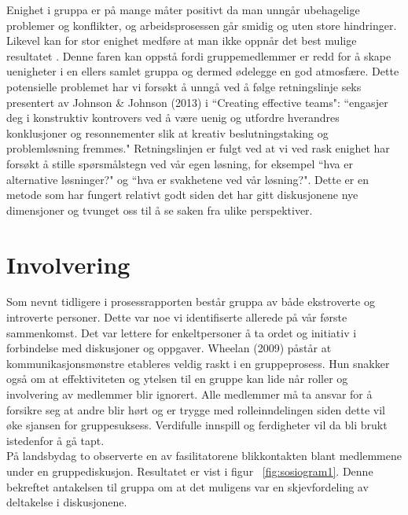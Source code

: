 Enighet i gruppa er på mange måter positivt da man unngår ubehagelige problemer og konflikter, og arbeidsprosessen går smidig og uten store hindringer. Likevel kan for stor enighet medføre at man ikke oppnår det best mulige resultatet \cite{effectiveTeams}. Denne faren kan oppstå fordi gruppemedlemmer er redd for å skape uenigheter i en ellers samlet gruppa og dermed ødelegge en god atmosfære. Dette potensielle problemet har vi forsøkt å unngå ved å følge retningslinje seks presentert av Johnson \& Johnson (2013)\cite{gruppeteori} i ``Creating effective teams": ``engasjer deg i konstruktiv kontrovers ved å være uenig og utfordre hverandres konklusjoner og resonnementer slik at kreativ beslutningstaking og problemløsning fremmes." Retningslinjen er fulgt ved at vi ved rask enighet har forsøkt å stille spørsmålstegn ved vår egen løsning, for eksempel ``hva er alternative løsninger?" og ``hva er svakhetene ved vår løsning?". Dette er en metode som har fungert relativt godt siden det har gitt diskusjonene nye dimensjoner og tvunget oss til å se saken fra ulike perspektiver.\\

\section{Involvering}
\label{sec:involvering}
Som nevnt tidligere i prosessrapporten består gruppa av både ekstroverte og introverte personer. Dette var noe vi identifiserte allerede på vår første sammenkomst. Det var lettere for enkeltpersoner å ta ordet og initiativ i forbindelse med diskusjoner og oppgaver. Wheelan (2009)\cite{effectiveTeams} påstår at kommunikasjonsmønstre etableres veldig raskt i en gruppeprosess. Hun snakker også om at effektiviteten og ytelsen til en gruppe kan lide når roller og involvering av medlemmer blir ignorert. Alle medlemmer må ta ansvar for å forsikre seg at andre blir hørt og er trygge med rolleinndelingen siden dette vil øke sjansen for gruppesuksess. Verdifulle innspill og ferdigheter vil da bli brukt istedenfor å gå tapt.\\

På landsbydag to observerte en av fasilitatorene blikkontakten blant medlemmene under en gruppediskusjon. Resultatet er vist i figur ~\ref{fig:sosiogram1}. Denne bekreftet antakelsen til gruppa om at det muligens var en skjevfordeling av deltakelse i diskusjonene.\\

